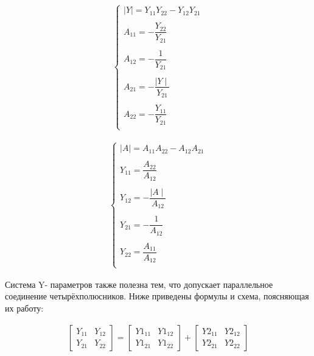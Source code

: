 \begin{equation}
\label{eq:6}
\begin{aligned}
 \begin{cases}
\mid Y\mid = Y_{11}Y_{22} - Y_{12}Y_{21}\\
\\
A_{11} = - \dfrac{Y_{22}}{Y_{21}}\\
\\
A_{12} = - \dfrac{1}{Y_{21}}\\
\\
A_{21} = - \dfrac{\mid Y\mid}{Y_{21}}\\
\\
A_{22} = - \dfrac{Y_{11}}{Y_{21}}\\
 \end{cases}
\end{aligned}
\end{equation}


\begin{equation}
\label{eq:7}
\begin{aligned}
 \begin{cases}
\mid A\mid = A_{11}A_{22} - A_{12}A_{21}\\
\\
Y_{11} = \dfrac{A_{22}}{A_{12}}\\
\\
Y_{12} = - \dfrac{\mid A\mid}{A_{12}}\\
\\
Y_{21} = - \dfrac{1}{A_{12}}\\
\\
Y_{22} = \dfrac{A_{11}}{A_{12}}\\
 \end{cases}
\end{aligned}
\end{equation}


Система  Y-  параметров  также  полезна  тем,  что  допускает  параллельное соединение  четырёхполюсников.  Ниже  приведены  формулы  и  схема, поясняющая их работу:


\begin{equation}
\label{eq:8}
\begin{aligned}
\begin{bmatrix} Y_{11} & Y_{12}\\ Y_{21} & Y_{22} \end{bmatrix} = \begin{bmatrix} Y1_{11} & Y1_{12}\\ Y1_{21} & Y1_{22} \end{bmatrix} +\begin{bmatrix} Y2_{11} & Y2_{12}\\ Y2_{21} & Y2_{22} \end{bmatrix}
\end{aligned}
\end{equation}


